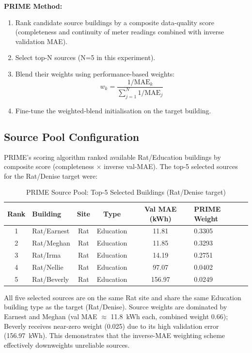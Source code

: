 \documentclass[12pt,a4paper]{report}
\begin{document}
\textbf{PRIME Method:}
\begin{enumerate}
    \item Rank candidate source buildings by a composite data-quality score (completeness and continuity of meter readings combined with inverse validation MAE).
    \item Select top-N sources (N=5 in this experiment).
    \item Blend their weights using performance-based weights:
    \[
    w_k = \frac{1 / \text{MAE}_k}{\sum_{j=1}^{N} 1 / \text{MAE}_j}
    \]
    \item Fine-tune the weighted-blend initialisation on the target building.
\end{enumerate}

\subsection{Source Pool Configuration}

PRIME's scoring algorithm ranked available Rat/Education buildings by composite score (completeness $\times$ inverse val-MAE). The top-5 selected sources for the Rat/Denise target were:

\begin{table}[H]
\centering
\caption{PRIME Source Pool: Top-5 Selected Buildings (Rat/Denise target)}
\small
\begin{tabular}{clcccl}
\toprule
\textbf{Rank} & \textbf{Building} & \textbf{Site} & \textbf{Type} & \textbf{Val MAE (kWh)} & \textbf{PRIME Weight} \\
\midrule
1 & Rat/Earnest & Rat & Education & 11.81 & 0.3305 \\
2 & Rat/Meghan & Rat & Education & 11.85 & 0.3293 \\
3 & Rat/Irma & Rat & Education & 14.19 & 0.2751 \\
4 & Rat/Nellie & Rat & Education & 97.07 & 0.0402 \\
5 & Rat/Beverly & Rat & Education & 156.97 & 0.0249 \\
\bottomrule
\end{tabular}
\end{table}

All five selected sources are on the same Rat site and share the same Education building type as the target (Rat/Denise). Source weights are dominated by Earnest and Meghan (val MAE $\approx$ 11.8~kWh each, combined weight 0.66); Beverly receives near-zero weight (0.025) due to its high validation error (156.97~kWh). This demonstrates that the inverse-MAE weighting scheme effectively downweights unreliable sources.
\end{document}

